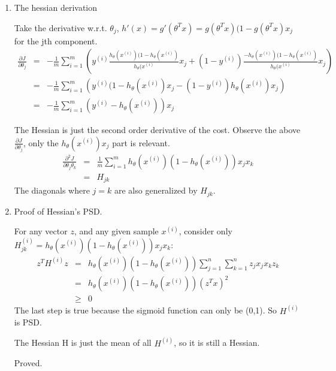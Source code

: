 \begin{answer}

\begin{enumerate}

\item The hessian derivation

Take the derivative w.r.t. $\theta_j$,  $h'(x) = g'(\theta^T x) = g(\theta^T x)(1-g(\theta^T x) x_j$ for the jth component.
\begin{eqnarray*}
    \frac{\partial J}{\partial \theta_j}
	&=& -\frac{1}{m} \sum_{i=1}^m \left(y^{(i)} \frac{h_{\theta}(x^{(i)}) (1-h_{\theta}(x^{(i)})} {h_{\theta}(x^{(i)}} x_j
	+ (1 - y^{(i)}) \frac{-h_{\theta}(x^{(i)})  (1-h_{\theta}(x^{(i)}) } {h_{\theta}(x^{(i)}} x_j \right) \\
	&=& -\frac{1}{m} \sum_{i=1}^m \left(y^{(i)}  (1-h_{\theta}(x^{(i)}) x_j
	- (1 - y^{(i)}) h_{\theta}(x^{(i)}) x_j \right) \\
	&=& -\frac{1}{m} \sum_{i=1}^m (y^{(i)} - h_{\theta}(x^{(i)})) x_j
\end{eqnarray*}

The Hessian is just the second order derivative of the cost. Observe the above $\frac{\partial J}{\partial \theta_j}$, 
only the $ h_{\theta}(x^{(i)}) x_j$ part is relevant.
\begin{eqnarray*}
    \frac{\partial^2 J}{\partial \theta_j \theta_k}
	&=& \frac{1}{m} \sum_{i=1}^m  h_{\theta}(x^{(i)})(1 -  h_{\theta}(x^{(i)})) x_j x_k \\
	&=& H_{jk}
\end{eqnarray*}
The diagonals where $j = k$ are also generalized by $H_{jk}$.

\item Proof of Hessian's PSD.

For any vector $z$, and any given sample $x^{(i)}$, 
consider only $H^{(i)}_{jk}=h_{\theta}(x^{(i)})(1 -  h_{\theta}(x^{(i)})) x_j x_k$:
\begin{eqnarray*}
z^T H^{(i)} z 
	&=& h_{\theta}(x^{(i)})(1 -  h_{\theta}(x^{(i)})) \sum_{j=1}^n \sum_{k=1}^n z_j x_j x_k z_k \\
	&=& h_{\theta}(x^{(i)})(1 -  h_{\theta}(x^{(i)})) (z^T x)^2 \\
	&\ge& 0
\end{eqnarray*}
The last step is true because the sigmoid function can only be (0,1). So $H^{(i)}$ is PSD.

The Hessian H is just the mean of all  $H^{(i)}$, so it is still a Hessian. 

Proved.

\end{enumerate}
\end{answer}
